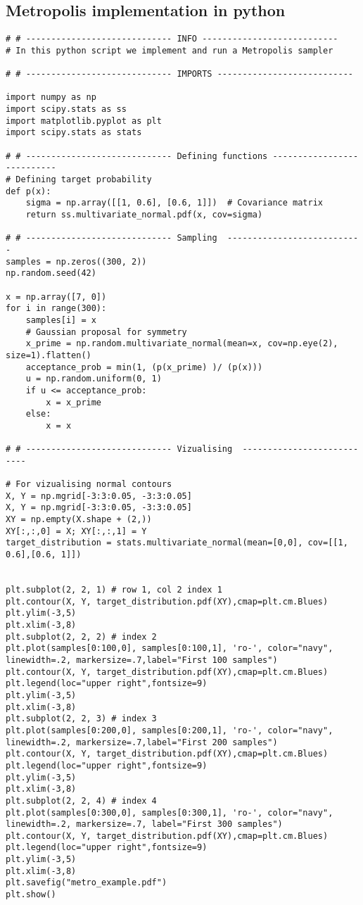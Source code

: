 \begin{appendices}
\section{Metropolis implementation in python}\label{app:MH_code}
\begin{lstlisting}
# # ----------------------------- INFO ---------------------------
# In this python script we implement and run a Metropolis sampler

# # ----------------------------- IMPORTS ---------------------------

import numpy as np
import scipy.stats as ss
import matplotlib.pyplot as plt
import scipy.stats as stats

# # ----------------------------- Defining functions ---------------------------
# Defining target probability
def p(x):
    sigma = np.array([[1, 0.6], [0.6, 1]])  # Covariance matrix
    return ss.multivariate_normal.pdf(x, cov=sigma)

# # ----------------------------- Sampling  ---------------------------
samples = np.zeros((300, 2))
np.random.seed(42)

x = np.array([7, 0])
for i in range(300):
    samples[i] = x
    # Gaussian proposal for symmetry
    x_prime = np.random.multivariate_normal(mean=x, cov=np.eye(2), size=1).flatten()
    acceptance_prob = min(1, (p(x_prime) )/ (p(x)))
    u = np.random.uniform(0, 1)
    if u <= acceptance_prob:
        x = x_prime
    else:
        x = x

# # ----------------------------- Vizualising  ---------------------------
 
# For vizualising normal contours       
X, Y = np.mgrid[-3:3:0.05, -3:3:0.05]    
X, Y = np.mgrid[-3:3:0.05, -3:3:0.05]
XY = np.empty(X.shape + (2,))
XY[:,:,0] = X; XY[:,:,1] = Y
target_distribution = stats.multivariate_normal(mean=[0,0], cov=[[1, 0.6],[0.6, 1]])


plt.subplot(2, 2, 1) # row 1, col 2 index 1
plt.contour(X, Y, target_distribution.pdf(XY),cmap=plt.cm.Blues)
plt.ylim(-3,5)
plt.xlim(-3,8)
plt.subplot(2, 2, 2) # index 2
plt.plot(samples[0:100,0], samples[0:100,1], 'ro-', color="navy", linewidth=.2, markersize=.7,label="First 100 samples")
plt.contour(X, Y, target_distribution.pdf(XY),cmap=plt.cm.Blues)
plt.legend(loc="upper right",fontsize=9)
plt.ylim(-3,5)
plt.xlim(-3,8)
plt.subplot(2, 2, 3) # index 3
plt.plot(samples[0:200,0], samples[0:200,1], 'ro-', color="navy", linewidth=.2, markersize=.7,label="First 200 samples")
plt.contour(X, Y, target_distribution.pdf(XY),cmap=plt.cm.Blues)
plt.legend(loc="upper right",fontsize=9)
plt.ylim(-3,5)
plt.xlim(-3,8)
plt.subplot(2, 2, 4) # index 4
plt.plot(samples[0:300,0], samples[0:300,1], 'ro-', color="navy", linewidth=.2, markersize=.7, label="First 300 samples")
plt.contour(X, Y, target_distribution.pdf(XY),cmap=plt.cm.Blues)
plt.legend(loc="upper right",fontsize=9)
plt.ylim(-3,5)
plt.xlim(-3,8)
plt.savefig("metro_example.pdf")
plt.show()
\end{lstlisting}

\end{appendices}
